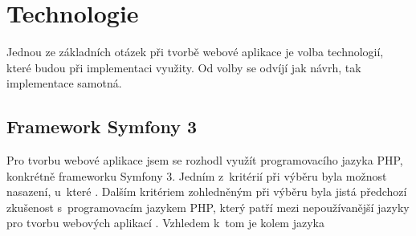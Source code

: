 \section{Technologie}
Jednou ze základních otázek při tvorbě webové aplikace je volba technologií, které budou při implementaci využity. Od volby se odvíjí jak návrh, tak implementace samotná. 

\subsection{Framework Symfony 3}
Pro tvorbu webové aplikace jsem se rozhodl využít programovacího jazyka \gls{PHP}, konkrétně frameworku Symfony 3. Jedním z~kritérií při výběru byla možnost nasazení, u~které . 
Dalším kritériem zohledněným při výběru byla jistá předchozí zkušenost s~programovacím jazykem PHP, který patří mezi nepoužívanější jazyky pro tvorbu webových aplikací \autocite{arg}. Vzhledem k~tom je kolem jazyka 
